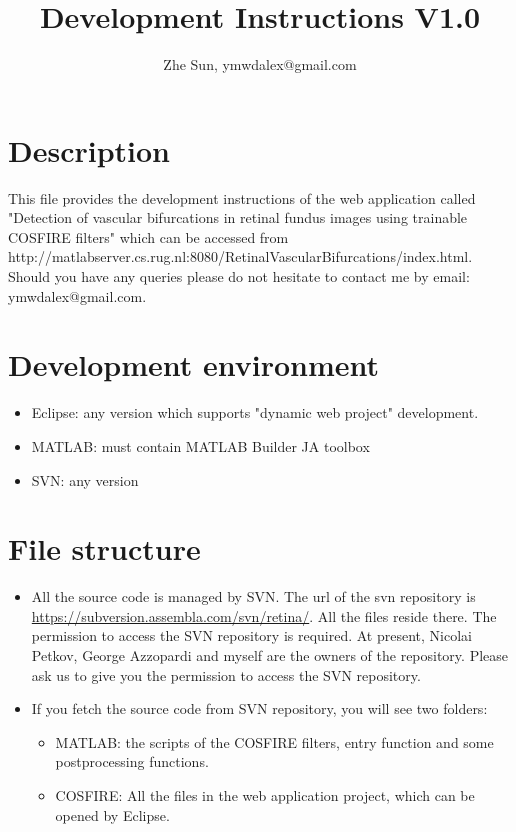 \documentclass[a4paper]{article}
\title{Development Instructions V1.0}
\author{Zhe Sun, ymwdalex@gmail.com}
\begin{document}
\maketitle

\section{Description}
This file provides the development instructions of the web application called "Detection of vascular bifurcations in retinal fundus images using trainable COSFIRE filters" which can be accessed from http://matlabserver.cs.rug.nl:8080/RetinalVascularBifurcations/index.html. Should you have any queries please do not hesitate to contact me by email: ymwdalex@gmail.com.

\section{Development environment}
\begin{itemize}
\item Eclipse: any version which supports "dynamic web project" development.
\item MATLAB: must contain MATLAB Builder JA toolbox
\item SVN: any version
\end{itemize}

\section{File structure}
\begin{itemize}
\item All the source code is managed by SVN. The url of the svn repository is \url{https://subversion.assembla.com/svn/retina/}. All the files reside there. The permission to access the SVN repository is required. At present, Nicolai Petkov, George Azzopardi and myself are the owners of the repository. Please ask us to give you the permission to access the SVN repository.
\item If you fetch the source code from SVN repository, you will see two folders:
	\begin{itemize}
	\item MATLAB: the scripts of the COSFIRE filters, entry function and some postprocessing functions.
	\item COSFIRE: All the files in the web application project, which can be opened by Eclipse.
	\end{itemize}
\end{itemize}
\end{document}

